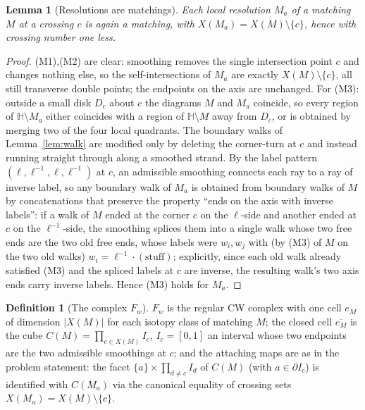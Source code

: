 \documentclass[11pt]{article}
\newtheorem{lemma}{Lemma}
\theoremstyle{definition}
\newtheorem{definition}{Definition}
\theoremstyle{remark}
\newcommand{\HH}{\mathbb{H}}
\newcommand{\bdy}{\partial}
\begin{document}
\begin{lemma}[Resolutions are matchings]\label{lem:resvalid}
Each local resolution $M_a$ of a matching $M$ at a crossing $c$ is again a
matching, with $X(M_a)=X(M)\setminus\{c\}$, hence with crossing number one less.
\end{lemma}

\begin{proof}
(M1),(M2) are clear: smoothing removes the single intersection point $c$ and
changes nothing else, so the self-intersections of $M_a$ are exactly
$X(M)\setminus\{c\}$, all still transverse double points; the endpoints on the
axis are unchanged. For (M3): outside a small disk $D_c$ about $c$ the diagrams
$M$ and $M_a$ coincide, so every region of $\HH\setminus M_a$ either coincides
with a region of $\HH\setminus M$ away from $D_c$, or is obtained by merging two
of the four local quadrants. The boundary walks of Lemma~\ref{lem:walk} are
modified only by deleting the corner-turn at $c$ and instead running straight
through along a smoothed strand. By the label pattern
$(\ell,\ell^{-1},\ell,\ell^{-1})$ at $c$, an admissible smoothing connects each
ray to a ray of inverse label, so any boundary walk of $M_a$ is obtained from
boundary walks of $M$ by concatenations that preserve the property ``ends on the
axis with inverse labels'': if a walk of $M$ ended at the corner $c$ on the
$\ell$-side and another ended at $c$ on the $\ell^{-1}$-side, the smoothing
splices them into a single walk whose two free ends are the two old free ends,
whose labels were $w_i,w_j$ with (by (M3) of $M$ on the two old walks)
$w_i=\ell^{-1}\cdot(\text{stuff})$; explicitly, since each old walk already
satisfied (M3) and the spliced labels at $c$ are inverse, the resulting walk's
two axis ends carry inverse labels. Hence (M3) holds for $M_a$.
\end{proof}

\begin{definition}[The complex $F_w$]\label{def:Fw}
$F_w$ is the regular CW complex with one cell $e_M$ of dimension $|X(M)|$ for
each isotopy class of matching $M$; the closed cell $\overline{e_M}$ is the cube
$C(M)=\prod_{c\in X(M)}I_c$, $I_c=[0,1]$ an interval whose two endpoints are the
two admissible smoothings at $c$; and the attaching maps are as in the problem
statement: the facet $\{a\}\times\prod_{d\ne c}I_d$ of $C(M)$ (with
$a\in\bdy I_c$) is identified with $C(M_a)$ via the canonical equality of
crossing sets $X(M_a)=X(M)\setminus\{c\}$.
\end{definition}
\end{document}
